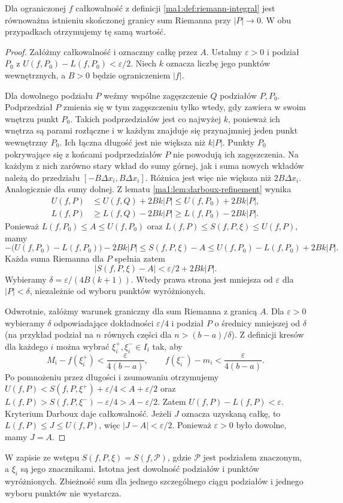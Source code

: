 \begin{twierdzenie}
\label{ma1:thm:riemann-darboux-equivalence}
Dla ograniczonej $f$ całkowalność z definicji \ref{ma1:def:riemann-integral} jest równoważna istnieniu skończonej granicy sum Riemanna przy $|P|\to0$. W obu przypadkach otrzymujemy tę samą wartość.
\end{twierdzenie}
\begin{proof}
Załóżmy całkowalność i oznaczmy całkę przez $A$. Ustalmy $\varepsilon>0$ i podział $P_0$ z $U(f,P_0)-L(f,P_0)<\varepsilon/2$. Niech $k$ oznacza liczbę jego punktów wewnętrznych, a $B>0$ będzie ograniczeniem $|f|$.

Dla dowolnego podziału $P$ weźmy wspólne zagęszczenie $Q$ podziałów $P,P_0$. Podprzedział $P$ zmienia się w tym zagęszczeniu tylko wtedy, gdy zawiera w swoim wnętrzu punkt $P_0$. Takich podprzedziałów jest co najwyżej $k$, ponieważ ich wnętrza są parami rozłączne i w każdym znajduje się przynajmniej jeden punkt wewnętrzny $P_0$. Ich łączna długość jest nie większa niż $k|P|$. Punkty $P_0$ pokrywające się z końcami podprzedziałów $P$ nie powodują ich zagęszczenia. Na każdym z nich zarówno stary wkład do sumy górnej, jak i suma nowych wkładów należą do przedziału $[-B\Delta x_i,B\Delta x_i]$. Różnica jest więc nie większa niż $2B\Delta x_i$. Analogicznie dla sumy dolnej. Z lematu \ref{ma1:lem:darboux-refinement} wynika
\[
 \begin{split}
 U(f,P)&\le U(f,Q)+2Bk|P|\le U(f,P_0)+2Bk|P|,\\
 L(f,P)&\ge L(f,Q)-2Bk|P|\ge L(f,P_0)-2Bk|P|.
 \end{split}
\]
Ponieważ $L(f,P_0)\le A\le U(f,P_0)$ oraz $L(f,P)\le S(f,P,\xi)\le U(f,P)$, mamy
\[
 -\bigl(U(f,P_0)-L(f,P_0)\bigr)-2Bk|P|
 \le S(f,P,\xi)-A
 \le U(f,P_0)-L(f,P_0)+2Bk|P|.
\]
Każda suma Riemanna dla $P$ spełnia zatem
\[
 |S(f,P,\xi)-A|<\varepsilon/2+2Bk|P|.
\]
Wybieramy $\delta=\varepsilon/(4B(k+1))$. Wtedy prawa strona jest mniejsza od $\varepsilon$ dla $|P|<\delta$, niezależnie od wyboru punktów wyróżnionych.

Odwrotnie, załóżmy warunek graniczny dla sum Riemanna z granicą $A$. Dla $\varepsilon>0$ wybieramy $\delta$ odpowiadające dokładności $\varepsilon/4$ i podział $P$ o średnicy mniejszej od $\delta$ (na przykład podział na $n$ równych części dla $n>(b-a)/\delta$). Z definicji kresów dla każdego $i$ można wybrać $\xi_i^+,\xi_i^-\in I_i$ tak, aby
\[
 M_i-f(\xi_i^+)<\frac{\varepsilon}{4(b-a)},\qquad
 f(\xi_i^-)-m_i<\frac{\varepsilon}{4(b-a)}.
\]
Po pomnożeniu przez długości i zsumowaniu otrzymujemy
$U(f,P)<S(f,P,\xi^+)+\varepsilon/4<A+\varepsilon/2$
oraz $L(f,P)>S(f,P,\xi^-)-\varepsilon/4>A-\varepsilon/2$.
Zatem $U(f,P)-L(f,P)<\varepsilon$. Kryterium Darboux daje całkowalność. Jeżeli $J$ oznacza uzyskaną całkę, to $L(f,P)\le J\le U(f,P)$, więc $|J-A|<\varepsilon/2$. Ponieważ $\varepsilon>0$ było dowolne, mamy $J=A$.
\end{proof}
W zapisie ze wstępu $S(f,P,\xi)=S(f,\mathcal P)$, gdzie $\mathcal P$ jest podziałem znaczonym, a $\xi_i$ są jego znacznikami. Istotna jest dowolność podziałów i punktów wyróżnionych. Zbieżność sum dla jednego szczególnego ciągu podziałów i jednego wyboru punktów nie wystarcza.

